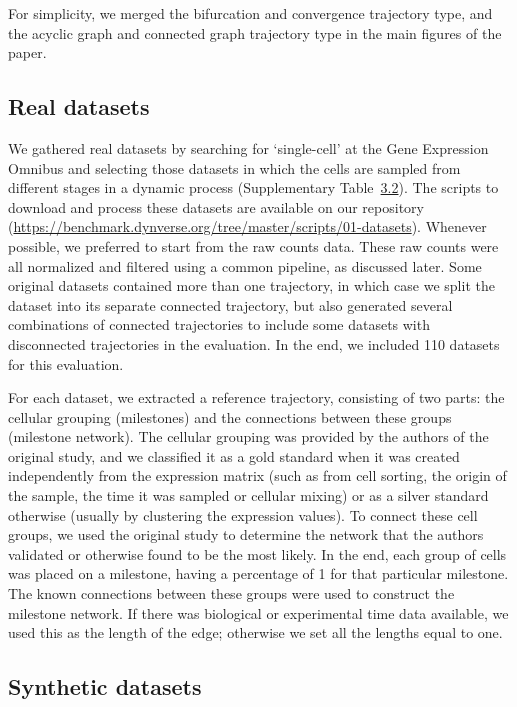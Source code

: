 For simplicity, we merged the bifurcation and convergence trajectory type, and the acyclic graph and connected graph trajectory type in the main figures of the paper.


\subsection{Real datasets}

We gathered real datasets by searching for ‘single-cell’ at the Gene Expression Omnibus and selecting those datasets in which the cells are sampled from different stages in a dynamic process (Supplementary Table~\hyperref[tab:supptable_2]{3.2}). The scripts to download and process these datasets are available on our repository (\href{https://benchmark.dynverse.org/tree/master/scripts/01-datasets}{https://benchmark.dynverse.org/tree/master/scripts/01-datasets}). Whenever possible, we preferred to start from the raw counts data. These raw counts were all normalized and filtered using a common pipeline, as discussed later. Some original datasets contained more than one trajectory, in which case we split the dataset into its separate connected trajectory, but also generated several combinations of connected trajectories to include some datasets with disconnected trajectories in the evaluation. In the end, we included 110 datasets for this evaluation.

For each dataset, we extracted a reference trajectory, consisting of two parts: the cellular grouping (milestones) and the connections between these groups (milestone network). The cellular grouping was provided by the authors of the original study, and we classified it as a gold standard when it was created independently from the expression matrix (such as from cell sorting, the origin of the sample, the time it was sampled or cellular mixing) or as a silver standard otherwise (usually by clustering the expression values). To connect these cell groups, we used the original study to determine the network that the authors validated or otherwise found to be the most likely. In the end, each group of cells was placed on a milestone, having a percentage of 1 for that particular milestone. The known connections between these groups were used to construct the milestone network. If there was biological or experimental time data available, we used this as the length of the edge; otherwise we set all the lengths equal to one.

\subsection{Synthetic datasets}

